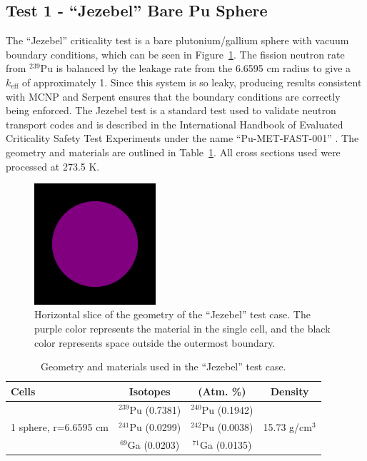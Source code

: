 \documentclass[preprint,12pt]{elsarticle}
\begin{document}
\newpage
\subsection{Test 1 - ``Jezebel'' Bare Pu Sphere}

The ``Jezebel'' criticality test is a bare plutonium/gallium sphere with vacuum boundary conditions, which can be seen in Figure~\ref{jezebel_geom_pic}.  The fission neutron rate from $^{239}$Pu is balanced by the leakage rate from the 6.6595 cm radius to give a $k_\mathrm{eff}$ of approximately 1.  Since this system is so leaky, producing results consistent with MCNP and Serpent ensures that the boundary conditions are correctly being enforced.  The Jezebel test is a standard test used to validate neutron transport codes and is described in the International Handbook of Evaluated Criticality Safety Test Experiments under the name ``Pu-MET-FAST-001'' \cite{bench_handbook}.  The geometry and materials are outlined in Table~\ref{jezebel_geom}.  All cross sections used were processed at 273.5 K.

\begin{figure}[!htbp] 
  \centering
    \includegraphics[width=0.4\textwidth]{graphics/jezebel-xy.png}
     \caption{ Horizontal slice of the geometry of the ``Jezebel'' test case.  The purple color represents the material in the single cell, and the black color represents space outside the outermost boundary. \label{jezebel_geom_pic} }
\end{figure}

\begin{table}[h]
\centering
\caption{Geometry and materials used in the ``Jezebel'' test case.}
\label{jezebel_geom}
\begin{tabular}{| l | c  c | c |}
\hline
Cells & Isotopes & (Atm. \%)& Density \\
\hline
\multirow{3}{*}{1 sphere, r=6.6595 cm }  &  $^{239}$Pu (0.7381)    &    $^{240}$Pu (0.1942)     &  \multirow{3}{*}{15.73 g/cm$^3$} \\
                                         &  $^{241}$Pu (0.0299)    &     $^{242}$Pu (0.0038)    &   \\
                                         &  $^{69}$Ga  (0.0203)    &     $^{71}$Ga  (0.0135)    &   \\
\hline
\end{tabular}
\end{table}
\end{document}
